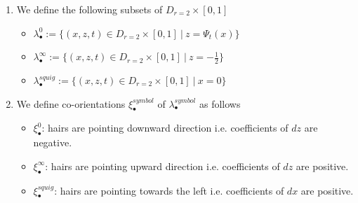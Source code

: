 \begin{definition}
\begin{enumerate}
\item We define the following subsets of $D_{r=2}\times [0,1]$
\begin{itemize}
\item $\lambda_\bullet^0 := \{(x,z,t) \in D_{r=2} \times [0,1] ~|~ z = \Psi_t(x)\}$

\item $\lambda_\bullet^\infty:=\{(x,z,t) \in D_{r=2}\times [0,1] ~|~ z = -\frac{1}{2}\}$

\item $\lambda_\bullet^{squig} := \{(x,z,t) \in D_{r=2}\times [0,1] ~|~ x=0 \}$
\end{itemize}

\item We define co-orientations $\xi_\bullet^{symbol}$ of $\lambda_\bullet^{symbol}$ as follows
\begin{itemize}
\item $\xi_\bullet^0$: hairs are pointing downward direction i.e. coefficients of $dz$ are negative.

\item $\xi_\bullet^\infty$: hairs are pointing upward direction i.e. coefficients of $dz$ are positive.

\item $\xi_\bullet^{squig}$: hairs are pointing towards the left i.e. coefficients of $dx$ are positive.
\end{itemize}
\end{enumerate}
\end{definition}

